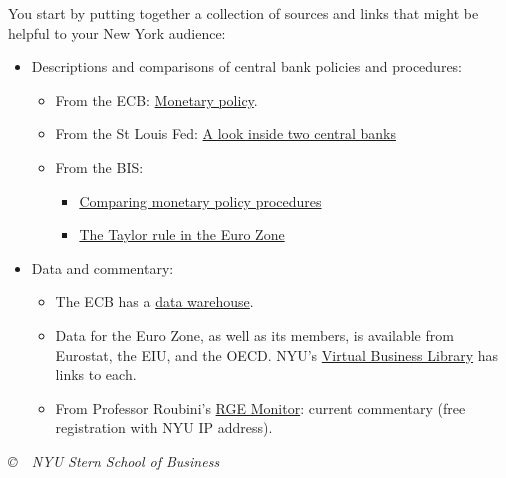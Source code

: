 \documentclass[letterpaper,12pt]{article}
\begin{document}
You start by putting together a collection of sources and 
links that might be helpful to your New York audience: 
%
\begin{itemize}

\item Descriptions and comparisons of central bank policies and procedures:
%
\begin{itemize}
\item From the ECB:  
\href{http://www.ecb.int/mopo/html/index.en.html}{Monetary policy}. 


\item From the St Louis Fed: 
\href{http://research.stlouisfed.org/publications/review/03/01/Pollard.pdf}
{A look inside two central banks} 

\item From the BIS:  
\begin{itemize}
\item \href{http://www.bis.org/publ/bispap09.htm}{Comparing monetary policy procedures}
\item \href{http://papers.ssrn.com/sol3/papers.cfm?abstract_id=856944}
{The Taylor rule in the Euro Zone} 

\end{itemize}

\end{itemize}

\item Data and commentary:  
\begin{itemize}
\item The ECB has a 
\href{http://www.ecb.int/stats/html/index.en.html}{data warehouse}.

\item Data for the Euro Zone, as well as its members, 
is available from Eurostat, the EIU, and the OECD.  
NYU's 
\href{http://library.nyu.edu/vbl/}{Virtual Business Library} 
has links to each.  


\item From Professor Roubini's 
\href{http://www.rgemonitor.com/}{RGE Monitor}:  current commentary (free registration with NYU IP address).

\end{itemize}

\end{itemize}


\vfill \centerline{\it \copyright \ \number\year \ 
NYU Stern School of Business}
\end{document}
